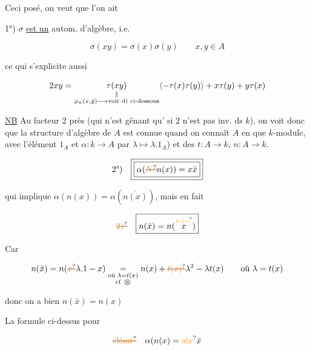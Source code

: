 
Ceci posé, on veut que l'on ait

1°) $\sigma$ \uline{est un} autom. d'algèbre, i.e.

\[
\boxed{\boxed{\sigma(xy)=\sigma(x)\sigma(y)}}\qquad x,y\in A
\]

ce qui s'explicite aussi

\[
2xy=\underset{\substack{\Vert\\\varphi_n(x,\bar y)\longrightarrow\text{voir d) ci-dessous}}}{\tau(xy)}
\inserted{-\tau(x)\tau(y)}+x\tau(y)+y\tau(x)
\]


\uline{NB} Au facteur $2$ près (qui n'est gênant qu' si $2$ n'est pas inv. ds $k$), on voit donc que la structure d'algèbre de $A$ est connue quand on connaît $A$ en  que $k$-module, avec l'élément $1_A$ et   $\alpha:k\longrightarrow A$ par $\lambda\longmapsto\lambda.1_A$) et des  $t:A\longrightarrow k$, $n:A\longrightarrow k$.


\[
\text{2°)}\quad\boxed{\boxed{\alpha(\deleted{\unsure{N}}n(x))=x\bar x}}
\]

qui implique $\alpha(n(x))=\alpha(\overline{n(x)})$, mais en  fait

\[
\deleted{\unsure{2)}}\quad\boxed{n(\bar x)=n(\overset{\unsure{\leftarrow|-}}{x})}
\]

Car

\[
n(\bar x)=n(\deleted{\unsure{x}}\lambda.1-x)\underset{\substack{\text{où }\lambda=t(x)\\\mathrm{cf}\ \text{\textcircled{a}}}}{=}
n(x)+\deleted{\unsure{t(x)}}\lambda^2-\lambda t(x)\qquad\text{où }\lambda=t(x)
\]

donc on a bien $n(\bar x)=n(x)$



La formule ci-dessus pour

\[
\deleted{\unsure{\text{élémt}}}\quad\alpha(n(x)=\unsure{o|x}\bar x
\]

